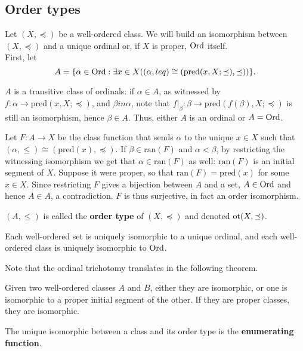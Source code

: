 \documentclass[twoside,openright,titlepage,numbers=noenddot,%
               headinclude,footinclude,cleardoublepage=empty,abstract=on,
               BCOR=23mm,paper=letter,fontsize=11pt
               ]{scrreprt}
\begin{document}
\subsection{Order types}
Let $(X, \preceq)$ be a well-ordered class. We will build an isomorphism between $(X, \preceq)$ and a unique ordinal or, if $X$ is proper, $\mathrm{Ord}$ itself. \\
First, let
\[ A = \{ \alpha \in \mathrm{Ord}: \exists x \in X((\alpha, leq) \cong (\mathrm{pred}(x,X;\preceq),\preceq))\}. \]
\begin{remark}
    $A$ is a transitive class of ordinals: if $\alpha \in A$, as witnessed by $f: \alpha \to \mathrm{pred}(x,X;\preceq)$, and $\beta in \alpha$, note that $f \vert_{\beta}: \beta \to \mathrm{pred}(f(\beta),X;\preceq)$ is still an isomorphism, hence $\beta \in A$. Thus, either $A$ is an ordinal or $A = \mathrm{Ord}$.
\end{remark}
Let $F: A \to X$ be the class function that sends $\alpha$ to the unique $x \in X$ such that $(\alpha, \leq) \cong (\mathrm{pred}(x),\preceq)$. If $\beta \in \mathrm{ran}(F)$ and $\alpha < \beta$, by restricting the witnessing isomorphism we get that $\alpha \in \mathrm{ran}(F)$ as well: $\mathrm{ran}(F)$ is an initial segment of $X$. Suppose it were proper, so that $\mathrm{ran}(F) = \mathrm{pred}(x)$ for some $x \in X$. Since restricting $F$ gives a bijection between $A$ and a set, $A \in \mathrm{Ord}$ and hence $A \in A$, a contradiction. $F$ is thus surjective, in fact an order isomorphism.
\begin{definition}
    $(A, \leq)$ is called the \textbf{order type} of $(X,\preceq)$ and denoted $\mathrm{ot}(X,\preceq)$.
\end{definition}
\begin{theorem}
    Each well-ordered set is uniquely isomorphic to a unique ordinal, and each well-ordered class is uniquely isomorphic to $\mathrm{Ord}$.
\end{theorem}
Note that the ordinal trichotomy translates in the following theorem.
\begin{theorem}
    Given two well-ordered classes $A$ and $B$, either they are isomorphic, or one is isomorphic to a proper initial segment of the other. If they are proper classes, they are isomorphic.
\end{theorem}
\begin{definition}
    The unique isomorphic between a class and its order type is the \textbf{enumerating function}.
\end{definition}
\end{document}
